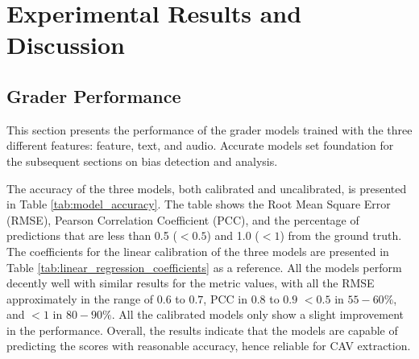 \chapter{Experimental Results and Discussion} \label{chap:results}

\section{Grader Performance} \label{sec:grader_performance}
This section presents the performance of the grader models trained with the three different features: feature, text, and audio. Accurate models set foundation for the subsequent sections on bias detection and analysis.

The accuracy of the three models, both calibrated and uncalibrated, is presented in Table \ref{tab:model_accuracy}. The table shows the Root Mean Square Error (RMSE), Pearson Correlation Coefficient (PCC), and the percentage of predictions that are less than 0.5 ($< 0.5$) and 1.0 ($< 1$) from the ground truth. The coefficients for the linear calibration of the three models are presented in Table \ref{tab:linear_regression_coefficients} as a reference. All the models perform decently well with similar results for the metric values, with all the RMSE approximately in the range of $0.6$ to $0.7$, PCC in $0.8$ to $0.9$ $< 0.5$ in $55-60\%$, and $< 1$ in $80-90\%$. All the calibrated models only show a slight improvement in the performance. Overall, the results indicate that the models are capable of predicting the scores with reasonable accuracy, hence reliable for CAV extraction.
